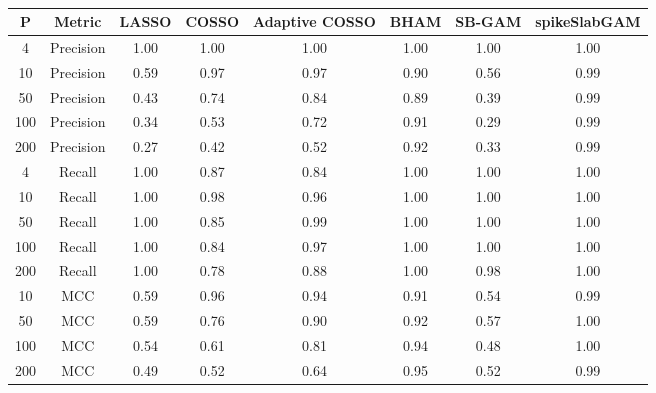 \begin{table}[ht]
\centering
\begin{tabular}{cccccccc}
  \hline
P & Metric & LASSO & COSSO & Adaptive COSSO & BHAM & SB-GAM & spikeSlabGAM \\ 
  \hline
  4 & Precision & 1.00 & 1.00 & 1.00 & 1.00 & 1.00 & 1.00 \\ 
   10 & Precision & 0.59 & 0.97 & 0.97 & 0.90 & 0.56 & 0.99 \\ 
   50 & Precision & 0.43 & 0.74 & 0.84 & 0.89 & 0.39 & 0.99 \\ 
  100 & Precision & 0.34 & 0.53 & 0.72 & 0.91 & 0.29 & 0.99 \\ 
  200 & Precision & 0.27 & 0.42 & 0.52 & 0.92 & 0.33 & 0.99 \\ 
    4 & Recall & 1.00 & 0.87 & 0.84 & 1.00 & 1.00 & 1.00 \\ 
   10 & Recall & 1.00 & 0.98 & 0.96 & 1.00 & 1.00 & 1.00 \\ 
   50 & Recall & 1.00 & 0.85 & 0.99 & 1.00 & 1.00 & 1.00 \\ 
  100 & Recall & 1.00 & 0.84 & 0.97 & 1.00 & 1.00 & 1.00 \\ 
  200 & Recall & 1.00 & 0.78 & 0.88 & 1.00 & 0.98 & 1.00 \\ 
   10 & MCC & 0.59 & 0.96 & 0.94 & 0.91 & 0.54 & 0.99 \\ 
   50 & MCC & 0.59 & 0.76 & 0.90 & 0.92 & 0.57 & 1.00 \\ 
  100 & MCC & 0.54 & 0.61 & 0.81 & 0.94 & 0.48 & 1.00 \\ 
  200 & MCC & 0.49 & 0.52 & 0.64 & 0.95 & 0.52 & 0.99 \\ 
   \hline
\end{tabular}
\caption{} 
\label{tab:sim_lnr_gaus_var_select}
\end{table}
